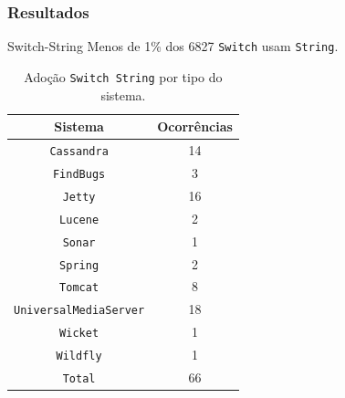 \documentclass[]{beamer}
\begin{document}
	\begin{frame}[fragile, label=re]\frametitle{Resultados}
		\begin{block}{Switch-String}
			Menos de 1\% dos  6827 \texttt{Switch} usam \texttt{String}.

			\begin{table}[ht!] \footnotesize
				\centering
				\caption{Adoção \texttt{Switch String} por tipo do sistema.}
				\begin{tabular}{cc}
					\hline
					Sistema & Ocorrências \\ 
					\hline \hline
					\texttt{Cassandra} & 14 \\ 
					\texttt{FindBugs} & 3 \\ 
					\texttt{Jetty} & 16 \\
					\texttt{Lucene} & 2 \\
					\texttt{Sonar} & 1 \\
					\texttt{Spring} & 2 \\
					\texttt{Tomcat} & 8 \\
					\texttt{UniversalMediaServer} & 18 \\
					\texttt{Wicket} & 1 \\
					\texttt{Wildfly} & 1 \\	 \hline
					\texttt{Total} & 66 \\ \hline
				\end{tabular}
				\label{tab:adocaoSwitchString} %
			\end{table}
		\end{block}
	\end{frame}
	
	
	
\end{document}
